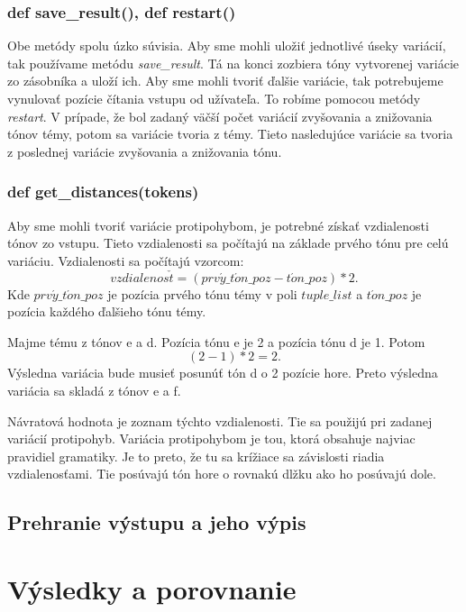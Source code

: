 \subsubsection*{def save\_result(), def restart()}
Obe metódy spolu úzko súvisia. Aby sme mohli uložiť jednotlivé úseky variácií, tak používame metódu \textit{save\_result}. Tá na konci zozbiera tóny vytvorenej variácie zo zásobníka a uloží ich. Aby sme mohli tvoriť ďalšie variácie, tak potrebujeme vynulovať pozície čítania vstupu od užívateľa. To robíme pomocou metódy \textit{restart}. V prípade, že bol zadaný väčší počet variácií zvyšovania a znižovania tónov témy, potom sa variácie tvoria z témy. Tieto nasledujúce variácie sa tvoria z poslednej variácie zvyšovania a znižovania tónu.

\subsubsection*{def get\_distances(tokens)}
Aby sme mohli tvoriť variácie protipohybom, je potrebné získať vzdialenosti tónov zo vstupu. Tieto vzdialenosti sa počítajú na základe prvého tónu pre celú variáciu. Vzdialenosti sa počítajú vzorcom: $$vzdialenos\check{t} = (prv\acute{y}\_t\acute{o}n\_poz - t\acute{o}n\_poz) * 2.$$ Kde $prv\acute{y}\_t\acute{o}n\_poz$ je pozícia prvého tónu témy v poli $tuple\_list$ a $t\acute{o}n\_poz$ je pozícia každého ďalšieho tónu témy.

\begin{example}
Majme tému z tónov e a d. Pozícia tónu e je 2 a pozícia tónu d je 1. Potom $$(2 - 1) * 2 = 2.$$ Výsledna variácia bude musieť posunúť tón d o 2 pozície hore. Preto výsledna variácia sa skladá z tónov e a f.
\end{example}

Návratová hodnota je zoznam týchto vzdialenosti. Tie sa použijú pri zadanej variácií protipohyb. Variácia protipohybom je tou, ktorá obsahuje najviac pravidiel gramatiky. Je to preto, že tu sa krížiace sa závislosti riadia vzdialenosťami. Tie posúvajú tón hore o rovnakú dlžku ako ho posúvajú dole.

\subsection{Prehranie výstupu a jeho výpis}
\section{Výsledky a porovnanie}

